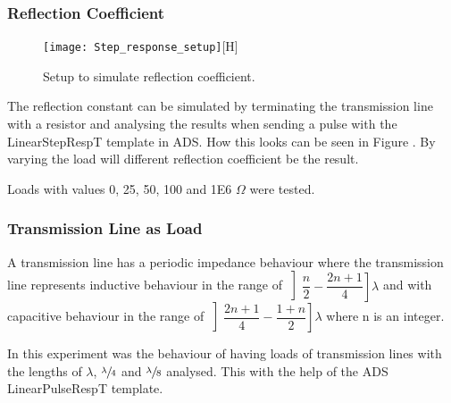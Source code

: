 \documentclass[report.tex]{subfiles}
\begin{document}
\subsubsection{Reflection Coefficient}

\begin{figure}
	\texttt{[image: Step\_response\_setup]}[H]
	\caption{Setup to simulate reflection coefficient.}\label{fig:Lab1 reflection coefficient}
\end{figure}

The reflection constant can be simulated by terminating the transmission line with a resistor and analysing the results when sending a pulse with the LinearStepRespT template in ADS. How this looks can be seen in Figure \label{fig:Lab1 reflection coefficient}. By varying the load will different reflection coefficient be the result.

Loads with values 0, 25, 50, 100 and 1E6 $\Omega$ were tested.

\subsubsection{Transmission Line as Load}
A transmission line has a periodic impedance behaviour where the transmission line represents inductive behaviour in the range of $\left] \dfrac{n}{2} - \dfrac{2n + 1}{4} \right]\lambda$ and with capacitive behaviour in the range of $\left]\dfrac{2n + 1}{4} - \dfrac{1 + n}{2} \right]\lambda$ where n is an integer.

In this experiment was the behaviour of having loads of transmission lines with the lengths of $\lambda$, $\sfrac{\lambda}{4}$ and $\sfrac{\lambda}{8}$ analysed. This with the help of the ADS LinearPulseRespT template.
\end{document}
